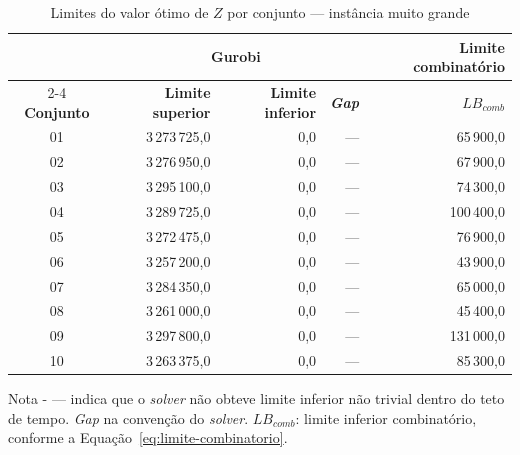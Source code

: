 \begin{table}[htbp]
    \caption{Limites do valor ótimo de $Z$ por conjunto --- instância muito grande}
    \label{tab:res-limites-muito-grande}
    \centering
    \begin{tabular}{crrrr}
        \hline
        & \multicolumn{3}{c}{\textbf{Gurobi}} & \textbf{Limite combinatório} \\
        \cline{2-4} \cline{5-5}
        \textbf{Conjunto} & \textbf{Limite superior} & \textbf{Limite inferior} & \textbf{\textit{Gap}} & \textbf{$LB_{comb}$} \\
        \hline
        01 & 3\,273\,725,0 & 0,0 & --- & 65\,900,0 \\
        02 & 3\,276\,950,0 & 0,0 & --- & 67\,900,0 \\
        03 & 3\,295\,100,0 & 0,0 & --- & 74\,300,0 \\
        04 & 3\,289\,725,0 & 0,0 & --- & 100\,400,0 \\
        05 & 3\,272\,475,0 & 0,0 & --- & 76\,900,0 \\
        06 & 3\,257\,200,0 & 0,0 & --- & 43\,900,0 \\
        07 & 3\,284\,350,0 & 0,0 & --- & 65\,000,0 \\
        08 & 3\,261\,000,0 & 0,0 & --- & 45\,400,0 \\
        09 & 3\,297\,800,0 & 0,0 & --- & 131\,000,0 \\
        10 & 3\,263\,375,0 & 0,0 & --- & 85\,300,0 \\
        \hline
    \end{tabular}
    \par\smallskip
    {\footnotesize Nota - --- indica que o \textit{solver} não obteve limite inferior não trivial dentro do teto de tempo. \textit{Gap} na convenção do \textit{solver}. $LB_{comb}$: limite inferior combinatório, conforme a Equação~\eqref{eq:limite-combinatorio}.}
\end{table}

